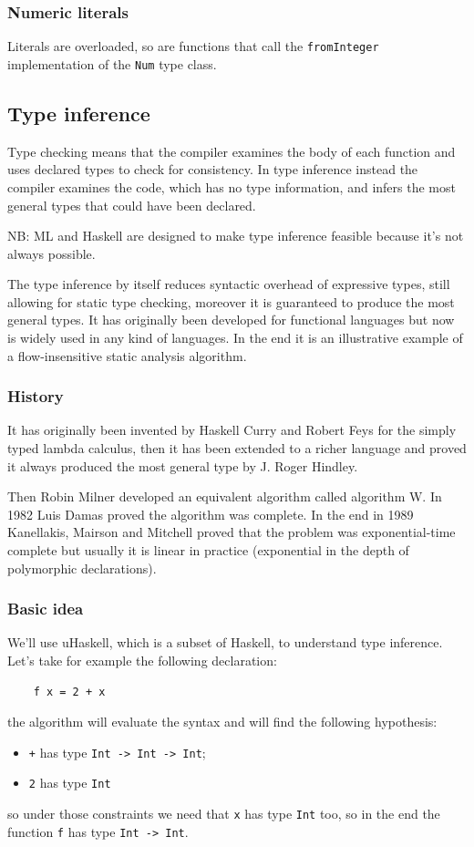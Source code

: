 \subsubsection{Numeric literals}
Literals are overloaded, so are functions that call the \verb|fromInteger| implementation of the \verb|Num| type class.

\subsection{Type inference}
Type checking means that the compiler examines the body of each function and uses declared types to check for consistency.
In type inference instead the compiler examines the code, which has no type information, and infers the most general types that could have been declared.

NB: ML and Haskell are designed to make type inference feasible because it's not always possible. 

The type inference by itself reduces syntactic overhead of expressive types, still allowing for static type checking, moreover it is guaranteed to produce the most general types.
It has originally been developed for functional languages but now is widely used in any kind of languages.
In the end it is an illustrative example of a flow-insensitive static analysis algorithm.

\subsubsection{History}
It has originally been invented by Haskell Curry and Robert Feys for the simply typed lambda calculus, then it has been extended to a richer language and proved it always produced the most general type by J. Roger Hindley.

Then Robin Milner developed an equivalent algorithm called algorithm W.
In 1982 Luis Damas proved the algorithm was complete.
In the end in 1989 Kanellakis, Mairson and Mitchell proved that the problem was exponential-time complete but usually it is linear in practice (exponential in the depth of polymorphic declarations).

\subsubsection{Basic idea}
We'll use uHaskell, which is a subset of Haskell, to understand type inference.
Let's take for example the following declaration:
\begin{verbatim}
    f x = 2 + x
\end{verbatim}
the algorithm will evaluate the syntax and will find the following hypothesis:
\begin{itemize}
    \item \verb|+| has type \verb|Int -> Int -> Int|;
    \item \verb|2| has type \verb|Int|
\end{itemize}
so under those constraints we need that \verb|x| has type \verb|Int| too, so in the end the function \verb|f| has type \verb|Int -> Int|.

